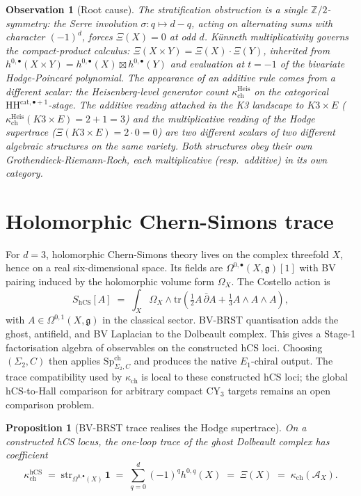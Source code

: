 \documentclass[11pt]{article}
\newtheorem{proposition}[theorem]{Proposition}
\newtheorem{observation}[theorem]{Observation}
\providecommand{\Z}{\mathbb{Z}}
\providecommand{\cA}{\mathcal{A}}
\providecommand{\HH}{\mathrm{HH}}
\providecommand{\str}{\mathrm{str}}
\begin{document}
\begin{observation}[Root cause]
\label{obs:root-cause}
The stratification obstruction is a single $\Z/2$-symmetry: the Serre
involution $\sigma\colon q\mapsto d-q$, acting on alternating sums with
character $(-1)^{d}$, forces $\Xi(X)=0$ at odd $d$. K\"unneth
multiplicativity governs the compact-product calculus:
$\Xi(X\times Y)=\Xi(X)\cdot\Xi(Y)$, inherited from
$h^{0,\bullet}(X\times Y)=h^{0,\bullet}(X)\boxtimes h^{0,\bullet}(Y)$
and evaluation at $t=-1$ of the bivariate Hodge-Poincar\'e polynomial.
The appearance of an additive rule comes from a different scalar:
the Heisenberg-level generator count
$\kappa_{\mathrm{ch}}^{\mathrm{Heis}}$ on the categorical
$\HH^{\mathrm{cat},\bullet+1}$-stage. The additive reading
attached in the K3 landscape to $K3\times E$
($\kappa_{\mathrm{ch}}^{\mathrm{Heis}}(K3\times E)=2+1=3$) and the
multiplicative reading of the Hodge supertrace
($\Xi(K3\times E)=2\cdot 0=0$) are two different scalars of two
different algebraic structures on the same variety. Both structures
obey their own Grothendieck-Riemann-Roch,
each multiplicative (resp.\ additive) in its own category.
\end{observation}

\section{Holomorphic Chern-Simons trace}
\label{sec:6d-hCS}

For \(d=3\), holomorphic Chern-Simons theory lives on the complex
threefold \(X\), hence on a real six-dimensional space. Its fields are
\(\Omega^{0,\bullet}(X,\mathfrak g)[1]\) with BV pairing induced by the
holomorphic volume form \(\Omega_X\). The Costello action is
\[
   S_{\mathrm{hCS}}[A]\;=\;\int_{X}\Omega_{X}\wedge
   \mathrm{tr}\!\left(\tfrac{1}{2}A\,\bar\partial A+\tfrac{1}{3}A\wedge A\wedge A\right),
\]
with \(A\in\Omega^{0,1}(X,\mathfrak g)\) in the classical sector.
BV-BRST quantisation adds the ghost, antifield,
and BV Laplacian to the Dolbeault complex. This gives a Stage-1
factorisation algebra of observables on the constructed hCS loci.
Choosing \((\Sigma_2,C)\) then applies
\(\mathrm{Sp}^{\mathrm{ch}}_{\Sigma_2,C}\) and produces the native
\(E_1\)-chiral output. The trace compatibility used by
\(\kappa_{\mathrm{ch}}\) is local to these constructed hCS loci; the
global hCS-to-Hall comparison for arbitrary compact CY$_3$ targets
remains an open comparison problem.

\begin{proposition}[BV-BRST trace realises the Hodge supertrace]
\label{prop:bv-trace}
On a constructed hCS locus, the one-loop trace of the ghost Dolbeault
complex has coefficient
\[
   \kappa_{\mathrm{ch}}^{\mathrm{hCS}}\;=\;\str_{\Omega^{0,\bullet}(X)}\,
   \mathbf{1}\;=\;\sum_{q=0}^{d}(-1)^{q}h^{0,q}(X)\;=\;\Xi(X)\;=\;\kappa_{\mathrm{ch}}(\cA_{X}).
\]
\end{proposition}
\end{document}
